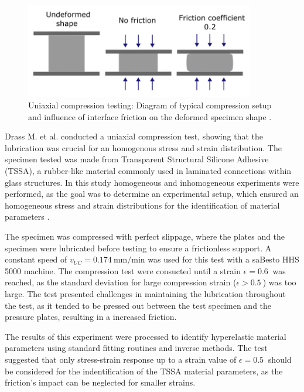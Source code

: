 \begin{figure}%
        \centering
       \quad
       \includegraphics[width=10cm]{Images/chapter1/compressiondiag.png}%
       \caption{Uniaxial compression testing: Diagram of typical compression setup and influence of interface friction on the deformed specimen shape \cite{Bergström2015}.}%
       \label{fig:compressiondiag}%
\end{figure}

Drass M. et al. conducted a uniaxial compression test, showing that the lubrication was 
crucial for an homogenous stress and strain distribution. The specimen tested was made from Transparent Structural 
Silicone Adhesive (TSSA), a rubber-like material commonly used in laminated connections within glass structures.
In this study homogeneous and inhomogeneous experiments were performed, as the goal was to determine an 
experimental setup, which ensured an homogeneous stress and strain distributions for the identification of material parameters \cite{Drass2018}.

The specimen was compressed with perfect slippage, where the plates and the specimen were lubricated 
before testing to ensure a frictionless support. A constant speed of $v_{UC}=\SI[per-mode = symbol]{0.174}{\milli \m\per \minute}$
was used for this test with a saBesto HHS 5000 machine. The compression test were consucted until a strain $\epsilon=\SI{0.6}{}$ 
was reached, as the standard deviation for large compression strain ($\epsilon>\SI{0.5}{}$) was too large.
The test presented challenges in maintaining the lubrication throughout the test, as it tended to be 
pressed out between the test specimen and the pressure plates, resulting in a increased friction. 

The results of this experiment were processed to identify hyperelastic material parameters using standard 
fitting routines and inverse methods. The test suggested that only stress-strain response up to a strain value of 
$\epsilon=\SI{0.5}{}$ should be considered for the indentification of the TSSA material parameters, as 
the friction's impact can be neglected for smaller strains.\\

